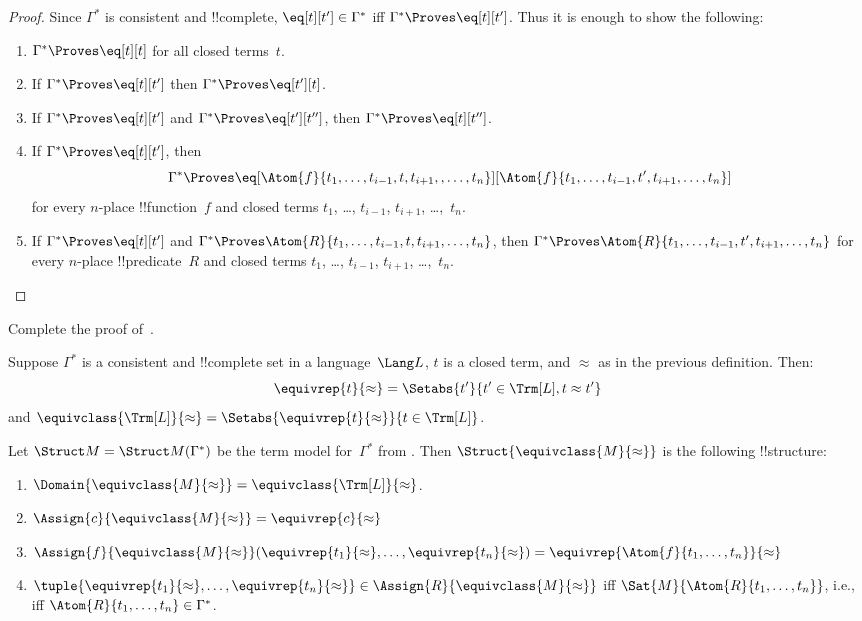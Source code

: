 \documentclass[../../../include/open-logic-section]{subfiles}
\begin{document}
\begin{proof}
Since $\Gamma^*$ is consistent and !!{complete}, $\eq[t][t'] \in
\Gamma^*$ iff $\Gamma^* \Proves \eq[t][t']$.  Thus it is enough to
show the following:
\begin{enumerate}
\item $\Gamma^* \Proves \eq[t][t]$ for all closed terms~$t$.
\item If $\Gamma^* \Proves \eq[t][t']$ then $\Gamma^* \Proves \eq[t'][t]$.
\item If $\Gamma^* \Proves \eq[t][t']$ and $\Gamma^* \Proves
  \eq[t'][t'']$, then $\Gamma^* \Proves \eq[t][t'']$.
\item If $\Gamma^* \Proves \eq[t][t']$, then
\[
\Gamma^* \Proves
\eq[\Atom{f}{t_1,\dots,t_{i-1},t,t_{i+1},,\dots,t_n}][\Atom{f}{t_1,\dots,t_{i-1},t',t_{i+1},\dots,t_n}]
\]
for every $n$-place !!{function}~$f$ and closed terms $t_1$, \dots,
$t_{i-1}$, $t_{i+1}$, \dots,~$t_n$.
\item If $\Gamma^* \Proves \eq[t][t']$ and
$\Gamma^* \Proves
\Atom{R}{t_1,\dots,t_{i-1},t,t_{i+1},\dots,t_n}$, then
$\Gamma^* \Proves \Atom{R}{t_1,\dots,t_{i-1},t',t_{i+1},\dots,t_n}$
for every $n$-place !!{predicate}~$R$ and closed terms $t_1$, \dots,
$t_{i-1}$, $t_{i+1}$, \dots,~$t_n$.
\end{enumerate}
\end{proof}

\begin{prob}
Complete the proof of~.
\end{prob}

\begin{defn}
Suppose $\Gamma^*$ is a consistent and !!{complete} set in a
language~$\Lang L$, $t$ is a closed term, and $\approx$ as in the
previous definition. Then:
\[
\equivrep{t}{\approx} = \Setabs{t'}{t'\in \Trm[L], t \approx t'}
\]
and $\equivclass{\Trm[L]}{\approx} = \Setabs{\equivrep{t}{\approx}}{t \in \Trm[L]}$.
\end{defn}

\begin{defn}
Let $\Struct M = \Struct M(\Gamma^*)$ be the term model
for~$\Gamma^*$ from .  Then $\Struct{\equivclass{M}{\approx}}$ is the following
!!{structure}:
\begin{enumerate}
\item $\Domain{\equivclass{M}{\approx}} = \equivclass{\Trm[L]}{\approx}$.
\item $\Assign{c}{\equivclass{M}{\approx}} = \equivrep{c}{\approx}$
\item $\Assign{f}{\equivclass{M}{\approx}}(\equivrep{t_1}{\approx}, \dots,
  \equivrep{t_n}{\approx}) = \equivrep{\Atom{f}{t_1,\dots, t_n}}{\approx}$
\item $\tuple{\equivrep{t_1}{\approx}, \dots, \equivrep{t_n}{\approx}} \in
  \Assign{R}{\equivclass{M}{\approx}}$ iff
  $\Sat{M}{\Atom{R}{t_1,\dots, t_n}}$, i.e., iff $\Atom{R}{t_1,\dots,
  t_n} \in \Gamma^*$.
\end{enumerate}
\end{defn}
\end{document}
